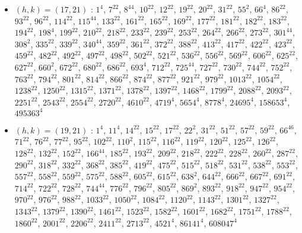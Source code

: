 \begin{itemize}
\item $(h,k)=(17,21)$ : $1^{4}$, $7^{22}$, $8^{44}$, $10^{22}$, $12^{22}$, $19^{22}$, $20^{22}$, $31^{22}$, $55^{2}$, $66^{4}$, $86^{22}$, $93^{22}$, $96^{22}$, $114^{22}$, $115^{44}$, $133^{22}$, $161^{22}$, $165^{22}$, $169^{22}$, $177^{22}$, $181^{22}$, $182^{22}$, $183^{22}$, $194^{22}$, $198^{4}$, $199^{22}$, $210^{22}$, $218^{22}$, $233^{22}$, $239^{22}$, $253^{22}$, $264^{22}$, $266^{22}$, $273^{22}$, $301^{44}$, $308^{2}$, $335^{22}$, $339^{22}$, $340^{44}$, $359^{22}$, $361^{22}$, $372^{22}$, $388^{22}$, $413^{22}$, $417^{22}$, $422^{22}$, $423^{22}$, $459^{22}$, $482^{22}$, $492^{22}$, $497^{22}$, $498^{22}$, $502^{22}$, $521^{22}$, $536^{22}$, $556^{22}$, $569^{22}$, $606^{22}$, $625^{22}$, $627^{22}$, $660^{2}$, $672^{22}$, $680^{22}$, $686^{22}$, $693^{4}$, $712^{22}$, $725^{44}$, $727^{22}$, $730^{22}$, $744^{22}$, $752^{22}$, $763^{22}$, $794^{22}$, $801^{22}$, $814^{22}$, $866^{22}$, $874^{22}$, $877^{22}$, $921^{22}$, $979^{22}$, $1013^{22}$, $1054^{22}$, $1238^{22}$, $1250^{22}$, $1315^{22}$, $1371^{22}$, $1378^{22}$, $1397^{22}$, $1468^{22}$, $1799^{22}$, $2088^{22}$, $2093^{22}$, $2251^{22}$, $2543^{22}$, $2554^{22}$, $2720^{22}$, $4610^{22}$, $4719^{4}$, $5654^{4}$, $8778^{4}$, $24695^{4}$, $158653^{4}$, $495363^{4}$
\item $(h,k)=(19,21)$ : $1^{4}$, $11^{4}$, $14^{22}$, $15^{22}$, $17^{22}$, $22^{2}$, $31^{22}$, $51^{22}$, $57^{22}$, $59^{22}$, $66^{46}$, $71^{22}$, $76^{22}$, $77^{22}$, $95^{22}$, $102^{22}$, $110^{2}$, $115^{22}$, $116^{22}$, $119^{22}$, $120^{22}$, $125^{22}$, $126^{22}$, $128^{22}$, $132^{22}$, $152^{22}$, $166^{44}$, $185^{22}$, $193^{22}$, $209^{22}$, $218^{22}$, $222^{22}$, $228^{22}$, $260^{22}$, $287^{22}$, $290^{22}$, $318^{22}$, $332^{22}$, $368^{22}$, $385^{22}$, $419^{22}$, $475^{22}$, $515^{22}$, $518^{22}$, $531^{22}$, $538^{22}$, $553^{22}$, $557^{22}$, $558^{22}$, $559^{22}$, $575^{22}$, $588^{22}$, $605^{22}$, $615^{22}$, $638^{2}$, $644^{22}$, $666^{22}$, $667^{22}$, $691^{22}$, $714^{22}$, $722^{22}$, $728^{22}$, $744^{44}$, $776^{22}$, $796^{22}$, $805^{22}$, $869^{2}$, $893^{22}$, $918^{22}$, $947^{22}$, $954^{22}$, $970^{22}$, $976^{22}$, $988^{22}$, $1033^{22}$, $1050^{22}$, $1084^{22}$, $1120^{22}$, $1143^{22}$, $1301^{22}$, $1327^{22}$, $1343^{22}$, $1379^{22}$, $1390^{22}$, $1461^{22}$, $1523^{22}$, $1582^{22}$, $1601^{22}$, $1682^{22}$, $1751^{22}$, $1788^{22}$, $1860^{22}$, $2001^{22}$, $2206^{22}$, $2411^{22}$, $2713^{22}$, $4521^{4}$, $86141^{4}$, $608047^{4}$
\end{itemize}
